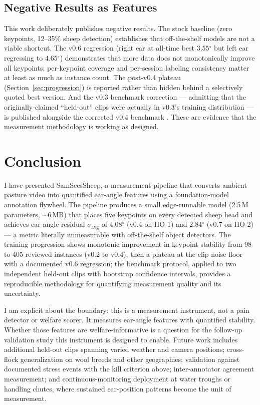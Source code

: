 \documentclass[11pt]{article}
\newcommand{\dgr}{\ensuremath{^{\circ}}}
\newcommand{\sigavg}{\ensuremath{\sigma_{\text{avg}}}}
\begin{document}
\subsection{Negative Results as Features}
This work deliberately publishes negative results. The stock baseline (zero
keypoints, 12--35\% sheep detection) establishes that off-the-shelf models are
not a viable shortcut. The v0.6 regression (right ear at all-time best $3.55\dgr$
but left ear regressing to $4.65\dgr$) demonstrates that more data does not
monotonically improve all keypoints; per-keypoint coverage and per-session
labeling consistency matter at least as much as instance count. The post-v0.4
plateau (Section~\ref{sec:progression}) is reported rather than hidden behind a
selectively quoted best version. And the v0.3 benchmark correction --- admitting
that the originally-claimed ``held-out'' clips were actually in v0.3's training
distribution --- is published alongside the corrected v0.4 benchmark
\citep{v03benchmark}. These are evidence that the measurement methodology is
working as designed.

\section{Conclusion}
I have presented SamSeesSheep, a measurement pipeline that converts ambient
pasture video into quantified ear-angle features using a foundation-model
annotation flywheel. The pipeline produces a small edge-runnable model (2.5\,M
parameters, ${\sim}6$\,MB) that places five keypoints on every detected sheep
head and achieves ear-angle residual $\sigavg$ of $4.08\dgr$ (v0.4 on HO-1)
and $2.84\dgr$ (v0.7 on HO-2) --- a metric literally unmeasurable
with off-the-shelf object detectors. The training progression shows monotonic
improvement in keypoint stability from 98 to 405 reviewed instances (v0.2 to
v0.4), then a plateau at the clip noise floor with a documented v0.6 regression;
the benchmark protocol, applied to two independent held-out clips with bootstrap
confidence intervals, provides a reproducible methodology for quantifying
measurement quality and its uncertainty.

I am explicit about the boundary: this is a measurement instrument, not a pain
detector or welfare scorer. It measures ear-angle features with quantified
stability. Whether those features are welfare-informative is a question for the
follow-up validation study this instrument is designed to enable. Future work
includes additional held-out clips spanning varied weather and camera positions;
cross-flock generalization on wool breeds and other geographies; validation
against documented stress events with the kill criterion above; inter-annotator
agreement measurement; and continuous-monitoring deployment at water troughs or
handling chutes, where sustained ear-position patterns become the unit of
measurement.
\end{document}
